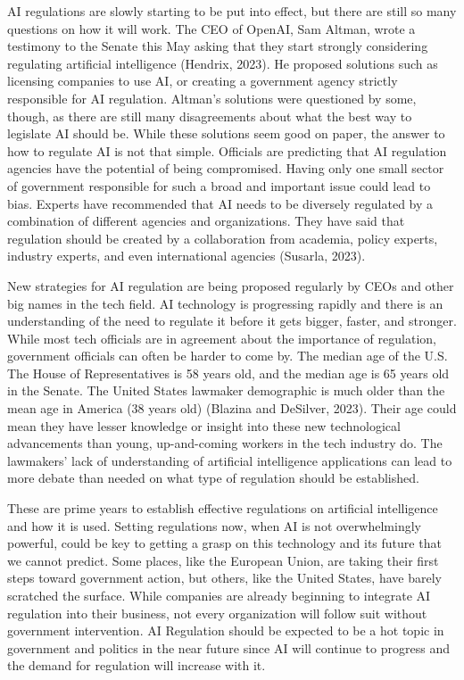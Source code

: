 \documentclass[
]{book}
\begin{document}
AI regulations are slowly starting to be put into effect, but there are still so many questions on how it will work. The CEO of OpenAI, Sam Altman, wrote a testimony to the Senate this May asking that they start strongly considering regulating artificial intelligence (Hendrix, 2023). He proposed solutions such as licensing companies to use AI, or creating a government agency strictly responsible for AI regulation. Altman's solutions were questioned by some, though, as there are still many disagreements about what the best way to legislate AI should be. While these solutions seem good on paper, the answer to how to regulate AI is not that simple. Officials are predicting that AI regulation agencies have the potential of being compromised. Having only one small sector of government responsible for such a broad and important issue could lead to bias. Experts have recommended that AI needs to be diversely regulated by a combination of different agencies and organizations. They have said that regulation should be created by a collaboration from academia, policy experts, industry experts, and even international agencies (Susarla, 2023).

New strategies for AI regulation are being proposed regularly by CEOs and other big names in the tech field. AI technology is progressing rapidly and there is an understanding of the need to regulate it before it gets bigger, faster, and stronger. While most tech officials are in agreement about the importance of regulation, government officials can often be harder to come by. The median age of the U.S. The House of Representatives is 58 years old, and the median age is 65 years old in the Senate. The United States lawmaker demographic is much older than the mean age in America (38 years old) (Blazina and DeSilver, 2023). Their age could mean they have lesser knowledge or insight into these new technological advancements than young, up-and-coming workers in the tech industry do. The lawmakers' lack of understanding of artificial intelligence applications can lead to more debate than needed on what type of regulation should be established.

These are prime years to establish effective regulations on artificial intelligence and how it is used. Setting regulations now, when AI is not overwhelmingly powerful, could be key to getting a grasp on this technology and its future that we cannot predict. Some places, like the European Union, are taking their first steps toward government action, but others, like the United States, have barely scratched the surface. While companies are already beginning to integrate AI regulation into their business, not every organization will follow suit without government intervention. AI Regulation should be expected to be a hot topic in government and politics in the near future since AI will continue to progress and the demand for regulation will increase with it.
\end{document}
